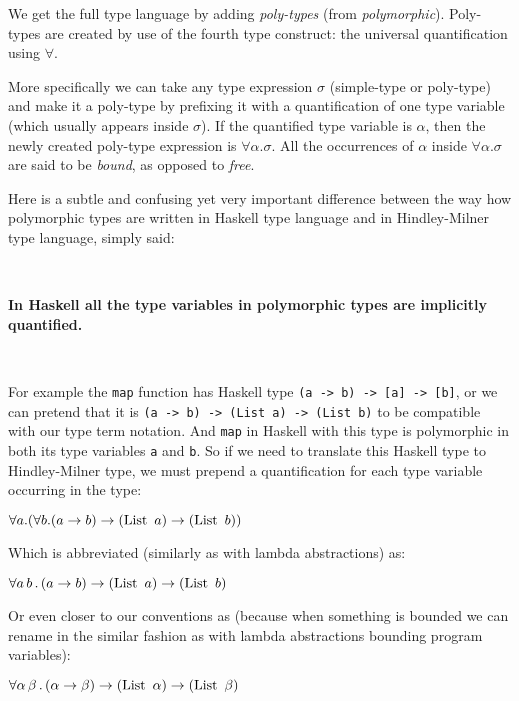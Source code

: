 \documentclass[a4paper,oneside]{memoir}
\begin{document}

We get the full type language by adding \textit{poly-types} (from \textit{polymorphic}). Poly-types  are created by use of the fourth type construct: the universal quantification using $\forall$. 

More specifically we can take any type expression $\sigma$ (simple-type or poly-type) and make 
it a poly-type by prefixing it with a quantification of one type variable (which usually appears inside $\sigma$). If the quantified type variable is $\alpha$, then the newly created poly-type expression is $\forall \alpha . \sigma$. All the occurrences of $\alpha$ inside $\forall \alpha . \sigma$ are said to be \textit{bound}, as opposed to \textit{free}.


Here is a subtle and confusing yet very important difference between the way how polymorphic types 
are written in Haskell type language and in Hindley-Milner type language, simply said:

~

\textbf{In Haskell all the type variables in polymorphic types are implicitly quantified.} 

~

For example the \texttt{map} function has Haskell type \texttt{(a -> b) -> [a] -> [b]},
or we can pretend that it is \texttt{(a -> b) -> (List a) -> (List b)} to be compatible with our type term notation.
And \texttt{map} in Haskell with this type is polymorphic in both its type variables \texttt{a}
and \texttt{b}. So if we need to translate this Haskell type to Hindley-Milner type, we must prepend a quantification for each type variable occurring in the type:

$\forall a . (\forall b . (a \rightarrow b) \rightarrow (\operatorname{List}~a) \rightarrow (\operatorname{List}~b))$

Which is abbreviated (similarly as with lambda abstractions) as:

$\forall a\,b\,.\,(a \rightarrow b) \rightarrow (\operatorname{List}~a) \rightarrow (\operatorname{List}~b)$

Or even closer to our conventions as (because when something is bounded we can rename in the similar fashion as with lambda abstractions bounding program variables):

$\forall \alpha\,\beta\,.\,(\alpha \rightarrow \beta) \rightarrow (\operatorname{List}~\alpha) \rightarrow (\operatorname{List}~\beta)$
\end{document}
